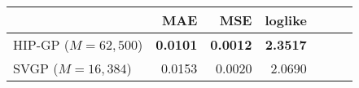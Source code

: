 \begin{tabular}{lrrrrrr}
\toprule
{}                  &   MAE   &  MSE    & loglike  \\
\midrule
HIP-GP ($M=62{,}500$) & \textbf{0.0101} & \textbf{0.0012} & \textbf{2.3517} \\
SVGP ($M=16{,}384$)   & 0.0153 & 0.0020 &  2.0690 \\
\bottomrule
\end{tabular}



